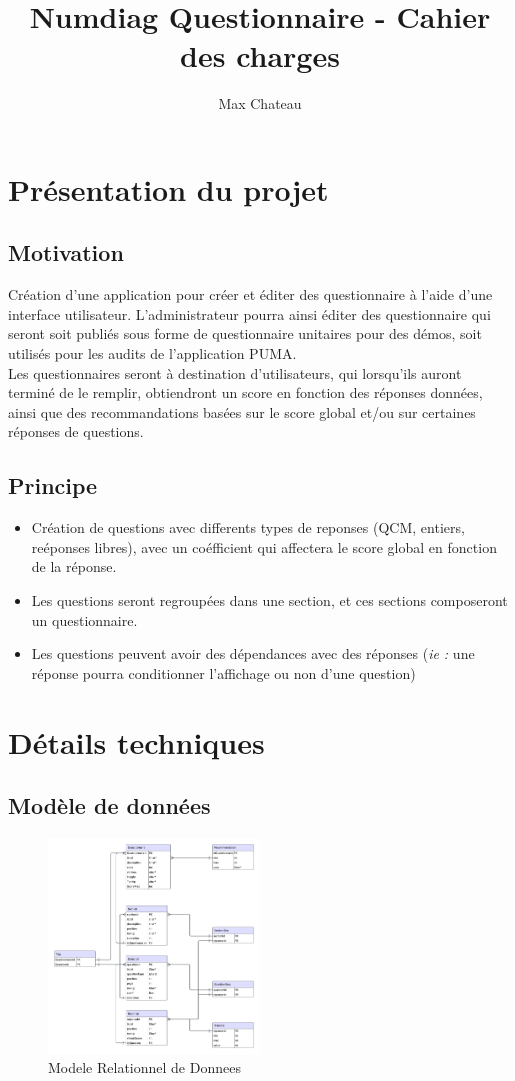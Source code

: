 \documentclass{extarticle}
\title{Numdiag Questionnaire - Cahier des charges}
\author{Max Chateau}
\date{}
\begin{document}
\maketitle{}
\section{Présentation du projet}
\subsection{Motivation}
Création d'une application pour créer et éditer des questionnaire à l'aide d'une interface utilisateur.
L'administrateur pourra ainsi éditer des questionnaire qui seront soit publiés sous forme de questionnaire unitaires pour des démos, soit utilisés pour les audits de l'application PUMA.\\
Les questionnaires seront à destination d'utilisateurs, qui lorsqu'ils auront terminé de le remplir, obtiendront un score en fonction des réponses données, ainsi que des recommandations basées sur le score global et/ou sur certaines réponses de questions.

\subsection{Principe}
\begin{itemize}
	\item Création de questions avec differents types de reponses (QCM, entiers, reéponses libres), avec un coéfficient qui affectera le score global en fonction de la réponse.
	\item Les questions seront regroupées dans une section, et ces sections composeront un questionnaire.
	\item Les questions peuvent avoir des dépendances avec des réponses (\textit{ie :} une réponse pourra conditionner l'affichage ou non d'une question)
\end{itemize}

\section{Détails techniques}
\subsection{Modèle de données}
\begin{figure}[h]
    \centering
    \includegraphics[width=0.5\textwidth]{NumdiagQuestionnaire.png}
    \caption{Modele Relationnel de Donnees}
    \label{fig:MRD}
\end{figure}
\end{document}

